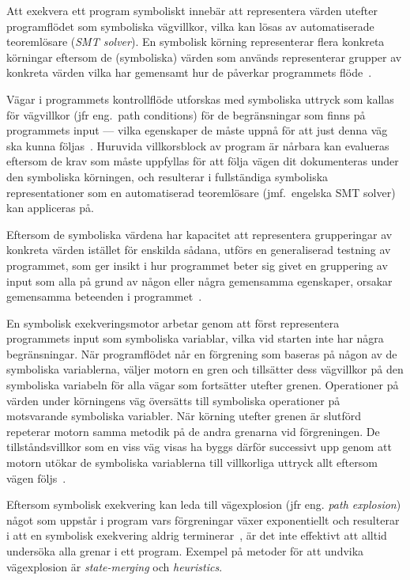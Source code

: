 Att exekvera ett program symboliskt innebär att representera värden utefter
programflödet som symboliska vägvillkor, vilka kan
lösas av automatiserade teoremlösare (\emph{SMT solver}). En symbolisk körning
representerar flera konkreta körningar eftersom de (symboliska) värden som
används representerar grupper av konkreta värden vilka har gemensamt hur de
påverkar programmets flöde~\cite{klee}.

Vägar i programmets kontrollflöde utforskas med symboliska uttryck som kallas
för vägvillkor (jfr eng.\ path conditions) för de begränsningar som finns på
programmets input --- vilka egenskaper de måste uppnå för att just denna väg
ska kunna följas~\cite{klee}. Huruvida villkorsblock av program är nårbara kan
evalueras eftersom de krav som måste uppfyllas för att följa vägen dit dokumenteras
under den symboliska körningen, och resulterar i fullständiga symboliska representationer
som en automatiserad teoremlösare (jmf.\ engelska SMT solver) kan appliceras på.

Eftersom de symboliska värdena har kapacitet att representera grupperingar av konkreta
värden istället för enskilda sådana, utförs en generaliserad testning av programmet,
som ger insikt i hur programmet beter sig givet en gruppering av input som alla
på grund av någon eller några gemensamma egenskaper, orsakar gemensamma beteenden
i programmet~\cite{Cadar}.

En symbolisk exekveringsmotor arbetar genom att först representera programmets
input som symboliska variablar, vilka vid starten inte har några begränsningar.
När programflödet når en förgrening som baseras på någon av de symboliska
variablerna, väljer motorn en gren och tillsätter dess vägvillkor på den
symboliska variabeln för alla vägar som fortsätter utefter grenen. Operationer
på värden under körningens väg översätts till symboliska operationer på
motsvarande symboliska variabler. När körning utefter grenen är
slutförd repeterar motorn samma metodik på de andra grenarna vid förgreningen.
De tillståndsvillkor som en viss väg visas ha byggs därför
successivt upp genom att motorn utökar de symboliska variablerna till
villkorliga uttryck allt eftersom vägen följs~\cite{klee}.

Eftersom symbolisk exekvering kan leda till vägexplosion (jfr eng. \emph{path explosion})
något som uppstår i program vars förgreningar växer exponentiellt och resulterar
i att en symbolisk exekvering aldrig terminerar~\cite{path_explo}, är det inte effektivt
att alltid undersöka alla grenar i ett program. Exempel på metoder för att
undvika vägexplosion är \emph{state-merging} och \emph{heuristics}.


